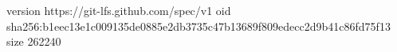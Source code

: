 version https://git-lfs.github.com/spec/v1
oid sha256:b1eec13e1c009135de0885e2db3735c47b13689f809edecc2d9b41c86fd75f13
size 262240

